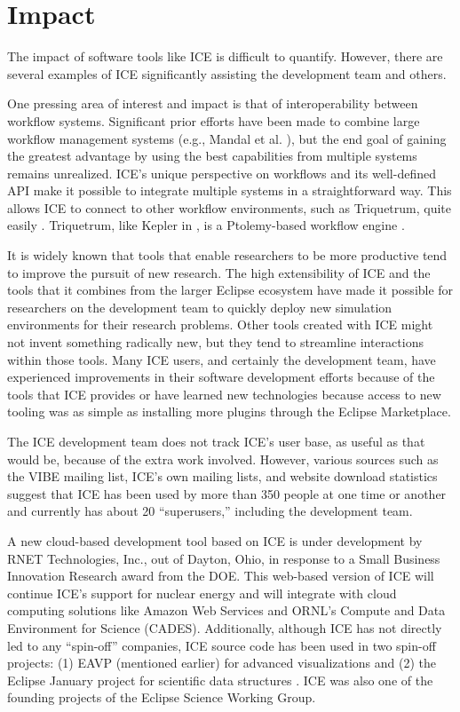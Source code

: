 \section{Impact}\label{impact}

The impact of software tools like ICE is difficult to quantify. However, there
are several examples of ICE significantly assisting the development team and
others.

One pressing area of interest and impact is that of interoperability
between workflow systems. Significant prior efforts have been made to
combine large workflow management systems (e.g., Mandal et al.
\cite{mandal_integrating_2007}), but the end goal of gaining the greatest
advantage by using the best capabilities from multiple systems remains unrealized.
ICE's unique perspective on workflows and its well-defined API make it
possible to integrate multiple systems in a straightforward way. This
allows ICE to connect to other workflow environments, such as Triquetrum,
quite easily \cite{brooks_introducing_2016}. Triquetrum, like Kepler in
\cite{mandal_integrating_2007}, is a Ptolemy-based workflow engine
\cite{brooks_triquetrum:_2015}.

It is widely known that tools that enable researchers to be more productive tend
to improve the pursuit of new research. The high extensibility of
ICE and the tools that it combines from the larger Eclipse ecosystem
have made it possible for researchers on the development team to quickly
deploy new simulation environments for their research problems. Other tools created
with ICE might not invent something radically new, but they tend to
streamline interactions within those tools. Many ICE users, and certainly
the development team, have experienced improvements in their software
development efforts because of the tools that ICE provides or have learned
new technologies because access to new tooling was as simple as
installing more plugins through the Eclipse Marketplace.

The ICE development team does not track ICE's user base, as useful as
that would be, because of the extra work involved. However, various
sources such as the VIBE mailing list, ICE's own mailing lists, and
website download statistics suggest that ICE has been used by more than 350
people at one time or another and currently has about 20
``superusers,'' including the development team.

A new cloud-based development tool based on ICE is under development by
RNET Technologies, Inc., out of Dayton, Ohio, in response to a Small Business Innovation 
Research award from the DOE. This web-based version of 
ICE will continue ICE's support for nuclear energy and will integrate with cloud 
computing solutions like Amazon Web Services and ORNL's Compute and Data
Environment for Science (CADES). Additionally, although ICE has not directly led
to any ``spin-off'' companies, ICE source code has been used
in two spin-off projects: (1) EAVP (mentioned earlier) for advanced
visualizations and (2) the Eclipse January project for scientific data
structures \cite{graham_eclipse_2016}. ICE was also one of the founding
projects of the Eclipse Science Working Group.

